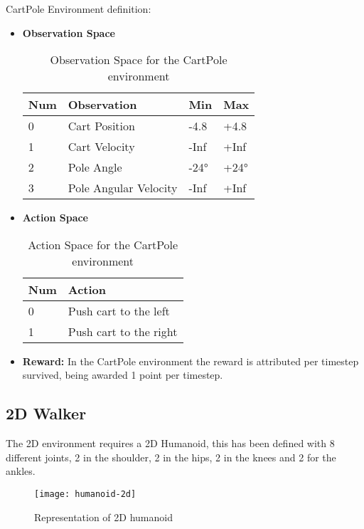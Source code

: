 CartPole Environment definition:
\begin{itemize}
 \item \textbf{Observation Space}
 \begin{table}[H]
 \caption{Observation Space for the CartPole environment}
 \centering
 \begin{tabular}{|l|l|l|l|}
 \hline
 Num & Observation & Min & Max \\ \hline
 0 & Cart Position & -4.8 & +4.8 \\ \hline
 1 & Cart Velocity & -Inf & +Inf \\ \hline
 2 & Pole Angle & -24° & +24° \\ \hline
 3 & Pole Angular Velocity & -Inf & +Inf \\ \hline
 \end{tabular}
 \end{table}
 \item \textbf{Action Space} 
 \begin{table}[H]
 \caption{Action Space for the CartPole environment}
 \centering
 \begin{tabular}{|l|l|}
 \hline
 Num & Action \\ \hline
 0 & Push cart to the left \\ \hline
 1 & Push cart to the right \\ \hline
 \end{tabular}
 \end{table}
 \item \textbf{Reward:} In the CartPole environment the reward is attributed per timestep survived, being awarded 1 point per timestep.
 \end{itemize} 

\subsection{2D Walker}
The 2D environment requires a 2D Humanoid, this has been defined with 8 different joints, 2 in the shoulder, 2 in the hips, 2 in the knees and 2 for the ankles.
\begin{figure}[H]
 \centering
 \texttt{[image: humanoid-2d]}
 \caption{Representation of 2D humanoid}
\end{figure}

